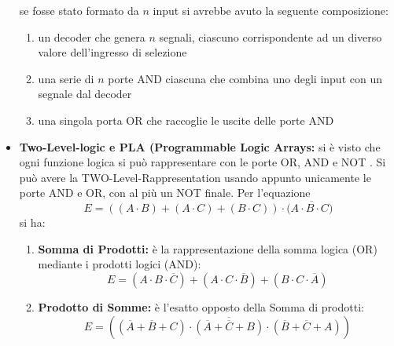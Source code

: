 \documentclass[a4paper,12pt, oneside]{book}
\begin{document}
\begin{itemize}
se fosse stato formato da $n$ input si avrebbe avuto la seguente composizione:
\begin{enumerate}
\item un decoder che genera $n$ segnali, ciascuno corrispondente ad un diverso valore dell'ingresso di selezione 
\item una serie di $n$ porte AND ciascuna che combina uno degli input con un segnale dal decoder
\item una singola porta OR che raccoglie le uscite delle porte AND
\end{enumerate}
\item \textbf{Two-Level-logic e PLA (Programmable Logic Arrays:} si è visto che ogni funzione logica si può rappresentare con le porte OR, AND e NOT . Si può avere la TWO-Level-Rappresentation usando appunto unicamente le porte AND e OR, con al più un NOT finale. Per l'equazione 
$$E=((A\cdot B)+(A\cdot C)+(B\cdot C))\cdot (\overline{A\cdot B\cdot C)}$$
si ha:
\begin{enumerate}
\item \textbf{Somma di Prodotti:} è la rappresentazione della somma logica (OR) mediante i prodotti logici (AND):
$$E=(A\cdot B\cdot \overline{C})+(A\cdot C\cdot \overline{B})+(B\cdot C\cdot \overline{A})$$
\item \textbf{Prodotto di Somme:} è l'esatto opposto della Somma di prodotti:
$$E=(\overline{(\overline{A}+\overline{B}+C)\cdot (\overline{A}+\overline{C}+B)\cdot (\overline{B}+\overline{C}+A) })$$
\end{enumerate}
\newpage


\end{itemize}
\end{document}
